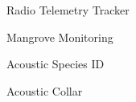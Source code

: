 \item Radio Telemetry Tracker
\item Mangrove Monitoring
\item Acoustic Species ID
\item Acoustic Collar

